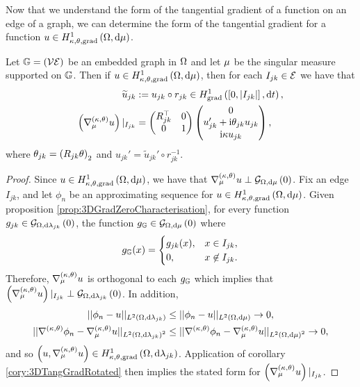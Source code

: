 Now that we understand the form of the tangential gradient of a function on an edge of a graph, we can determine the form of the tangential gradient for a function $u\in H^1_{\kappa,\theta,\mathrm{grad}}\left( \Omega, \mathrm{d}\mu \right)$.
\begin{cory} \label{cory:3DTangGradGraph}
	Let $\mathbb{G}=\left( \mathcal{V} \mathcal{E} \right)$ be an embedded graph in $\Omega$ and let $\mu$ be the singular measure supported on $\mathbb{G}$.
	Then if $u\in H^1_{\kappa,\theta,\mathrm{grad}}\left( \Omega, \mathrm{d}\mu \right)$, then for each $I_{jk}\in\mathcal{E}$ we have that
	\begin{align*}
		\widetilde{u}_{jk} &:= u_{jk} \circ r_{jk} \in H^1_\mathrm{grad}\left( \left[ 0,\left\lvert I_{jk} \right\rvert \right], \mathrm{d}t \right), \\
		\left(  \nabla^{\left( \kappa, \theta \right)}_{\mu} u  \right)\vert_{I_{jk}} &= 
		\begin{pmatrix} R^{\top}_{jk} & 0 \\ 0 & 1	\end{pmatrix}
		\begin{pmatrix} 0 \\ u_{jk}' + \mathrm{i}\theta_{jk}u_{jk} \\ \mathrm{i}\kappa u_{jk} \end{pmatrix},
	\end{align*}
	where $\theta_{jk} = \left(  R_{jk}\theta  \right)_2$ and $u_{jk}' = \widetilde{u}_{jk}' \circ r_{jk}^{-1}$.
\end{cory}
\begin{proof}
	Since $u\in H^1_{\kappa,\theta,\mathrm{grad}}\left( \Omega, \mathrm{d}\mu \right)$, we have that $\nabla^{\left( \kappa, \theta \right)}_{\mu} u \perp \mathcal{G}_{ \Omega, \mathrm{d}\mu}\left( 0 \right)$.
	Fix an edge $I_{jk}$, and let $\phi_n$ be an approximating sequence for $u\in H^1_{\kappa,\theta,\mathrm{grad}}\left( \Omega, \mathrm{d}\mu \right)$.
	Given proposition \ref{prop:3DGradZeroCharacterisation}, for every function $g_{jk}\in\mathcal{G}_{ \Omega, \mathrm{d}\lambda_{jk}}\left( 0 \right)$, the function $g_{\mathbb{G}}\in\mathcal{G}_{ \Omega, \mathrm{d}\mu}\left( 0 \right)$ where
	\begin{align*}
		g_{\mathbb{G}}(x) = 
		\begin{cases} 
			g_{jk}(x), & x\in I_{jk}, \\
			0, & x\not\in I_{jk}.
		\end{cases}
	\end{align*}
	Therefore, $\nabla^{\left( \kappa, \theta \right)}_{\mu} u$ is orthogonal to each $g_{\mathbb{G}}$ which implies that $\left(  \nabla^{\left( \kappa, \theta \right)}_{\mu} u  \right)\vert_{I_{jk}} \perp \mathcal{G}_{ \Omega, \mathrm{d}\lambda_{jk}}\left( 0 \right)$.
	In addition, 
	\begin{align*}
		\lvert\lvert \phi_n - u \rvert\rvert_{L^{2}\left( \Omega,\mathrm{d}\lambda_{jk} \right)} &\leq \lvert\lvert \phi_n - u \rvert\rvert_{L^{2}\left( \Omega,\mathrm{d}\mu \right)} \rightarrow 0, \\
		\lvert\lvert \nabla^{\left( \kappa, \theta \right)}\phi_n - \nabla^{\left( \kappa, \theta \right)}_{\mu} u \rvert\rvert_{L^{2}\left( \Omega,\mathrm{d}\lambda_{jk} \right)^2} &\leq \lvert\lvert \nabla^{\left( \kappa, \theta \right)}\phi_n - \nabla^{\left( \kappa, \theta \right)}_{\mu} u \rvert\rvert_{L^{2}\left( \Omega,\mathrm{d}\mu \right)^2} \rightarrow 0,
	\end{align*}
	and so $\left( u, \nabla^{\left( \kappa, \theta \right)}_{\mu} u \right)\in H^1_{\kappa,\theta,\mathrm{grad}}\left( \Omega, \mathrm{d}\lambda_{jk} \right)$.
	Application of corollary \ref{cory:3DTangGradRotated} then implies the stated form for $\left(  \nabla^{\left( \kappa, \theta \right)}_{\mu} u  \right)\vert_{I_{jk}}$.
\end{proof}

